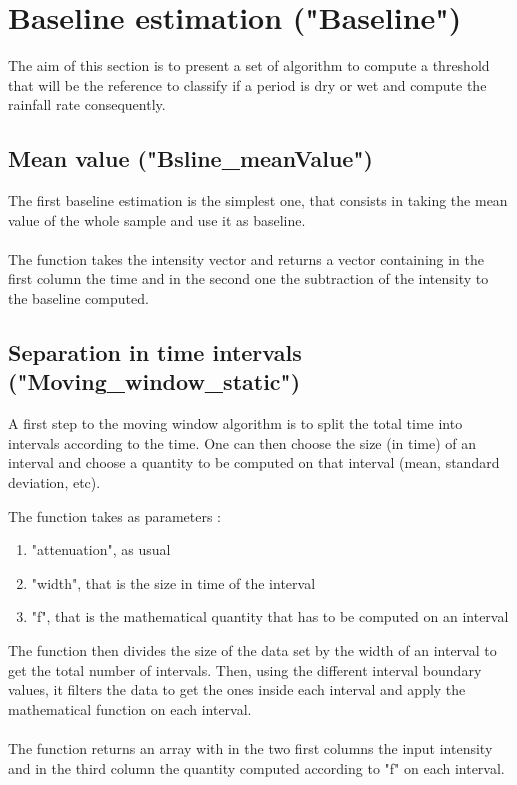 \documentclass[a4wide,12pt]{article}
\begin{document}
\section{Baseline estimation ("Baseline")}
The aim of this section is to present a set of algorithm to compute a threshold that will be the reference to classify if a period is dry or wet and compute the rainfall rate consequently. 

\subsection{Mean value ("Bsline\_meanValue")}
The first baseline estimation is the simplest one, that consists in taking the mean value of the whole sample and use it as baseline. 
\\ \\
The function takes the intensity vector and returns a vector containing in the first column the time and in the second one the subtraction of the intensity to the baseline computed. 

\subsection{Separation in time intervals ("Moving\_window\_static")}
A first step to the moving window algorithm is to split the total time into intervals according to the time. One can then choose the size (in time) of an interval and choose a quantity to be computed on that interval (mean, standard deviation, etc). 

The function takes as parameters :

\begin{enumerate}
\item "attenuation", as usual
\item "width", that is the size in time of the interval
\item "f", that is the mathematical quantity that has to be computed on an interval 
\end{enumerate}

The function then divides the size of the data set by the width of an interval to get the total number of intervals. Then, using the different interval boundary values, it filters the data to get the ones inside each interval and apply the mathematical function on each interval. 
\\ \\
The function returns an array with in the two first columns the input intensity and in the third column the quantity computed according to "f" on each interval.
\end{document}
